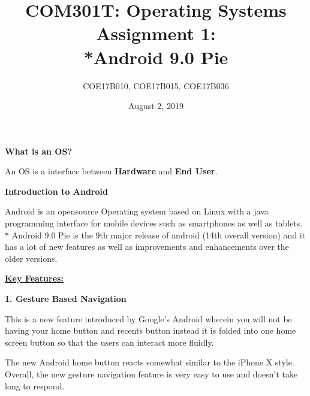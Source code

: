 \documentclass[12pt]{article}
\begin{document}

\title{\color{black}COM301T: Operating Systems Assignment 1: \\*Android 9.0 Pie}
\author{{\color{black}COE17B010, COE17B015, COE17B036}}
\date{August 2, 2019}
\maketitle



\setlength{\parskip}{16.08pt}
{
\fontsize{20pt}{22.6pt}\selectfont \textbf{What is an OS?}\par
}\par 
\setlength{\parskip}{8.04pt}
\textcolor[HTML]{4A4A4A}{An OS is a interface between   \textbf{Hardware} and \textbf{End User}.}\par

{\fontsize{20pt}{22.6pt}\selectfont \textbf{Introduction to Android}\par}\par 
\textcolor[HTML]{4A4A4A}{Android is an opensource Operating system based on Linux with a java programming interface for mobile devices such as smartphones as well as tablets.\\*
Android 9.0 Pie is the 9th major release of android (14th overall version) and it has a lot of new features as well as improvements and enhancements over the older versions.}
\par

{\fontsize{18pt}{21.6pt}\selectfont \textbf{\uline{Key Features:}}\par}\par

\setlength{\parskip}{8.04pt}

\textbf{\textcolor[HTML]{4A4A4A}{1. Gesture Based Navigation}}\par

\textcolor[HTML]{4A4A4A}{This is a new feature introduced by Google’s Android wherein you will not be having your home button and recents button instead it is folded into one home screen button so that the users can interact more fluidly.}\par
\textcolor[HTML]{4A4A4A}{The new Android home button reacts somewhat similar to the iPhone X style. Overall, the new gesture navigation feature is very easy to use and doesn’t take long to respond.}\par
\end{document}
